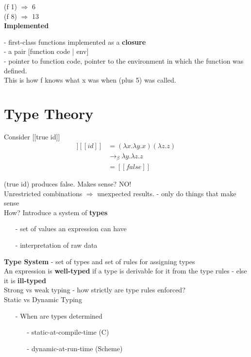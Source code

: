 \documentclass[11pt]{article}
\begin{document}
(f 1) $\Rightarrow$ 6 \\

(f 8) $\Rightarrow$ 13 \\

{\bf Implemented}

- first-class functions implemented as a {\bf closure} \\

- a pair [function code | env] \\

- pointer to function code, pointer to the environment in which the function was defined. \\

This is how f knows what x was when (plus 5) was called. \\

\pagebreak

\section{Type Theory} 

Consider [[true id]] 
\begin{align*}
[[true]][[id]] &= (\lambda x.\lambda y.x)(\lambda z.z) \\
&\rightarrow_\beta \lambda y.\lambda z.z \\
&= [[false]]
\end{align*}

(true id) produces false. Makes sense? NO! \\

Unrestricted combinations $\Rightarrow$ unexpected results. - only do things that make sense \\

How? Introduce a system of {\bf types}
\begin{itemize}
	\item[-] set of values an expression can have
	\item[-] interpretation of raw data
\end{itemize}

{\bf Type System} - set of types and set of rules for assigning types \\

An expression is {\bf well-typed} if a type is derivable for it from the type rules - else it is {\bf ill-typed} \\

Strong vs weak typing - how strictly are type rules enforced? \\

Static vs Dynamic Typing
\begin{itemize}
	\item[-] When are types determined
		\begin{itemize}
			\item[-] static-at-compile-time (C)
			\item[-] dynamic-at-run-time (Scheme)
		\end{itemize}
\end{itemize}
\end{document}
